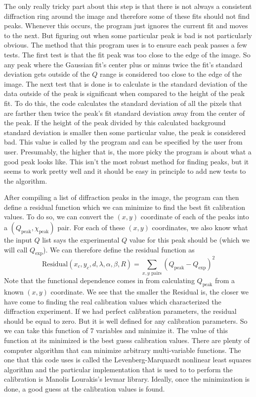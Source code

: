 The only really tricky part about this step is that
there is not always a consistent diffraction ring 
around the image and therefore some of these fits 
should not find peaks. Whenever this occurs, the program
just ignores the current fit and moves to the next. 
But figuring out when some particular peak is bad
is not particularly obvious. The method that this
program uses is to ensure each peak passes a few
tests. The first test is that the fit peak was
too close to the edge of the image. So any peak where
the Gaussian fit's center plus or minus twice the fit's
standard deviation gets outside of the $Q$ range is
considered too close to the edge of the image.
The next test that is done is to calculate is the
standard deviation of the data outside of the peak is
significant when compared to the height of the peak
fit. To do this, the code calculates the standard 
deviation of all the pixels that are farther then twice
the peak's fit standard deviation away from the
center of the peak. If the height of the peak
divided by this calculated background standard deviation
is smaller then some particular value, the peak is
considered bad. This value is called by the program
 and can be specified by the user from user.
Presumably, the higher that  is, the
more picky the program is about what a good peak looks
like. This isn't the most robust method for finding peaks,
but it seems to work pretty well and it should be easy 
in principle to add new tests to the algorithm.

After compiling a list of diffraction peaks in the image,
the program can then define a residual function which
we can minimize to find the best fit calibration values.
To do so, we can convert the $(x,y)$ coordinate
of each of the peaks into a 
$(Q_{\text{peak}},\chi_{\text{peak}})$ pair. 
For each of these $(x,y)$ coordinates, we also
know what the input $Q$ list says the experimental $Q$ 
value for this peak should be (which we will call 
$Q_{\text{exp}}$). We can therefore define
the residual function as
\begin{equation}\label{residual}
    \text{Residual}(x_c,y_c,d,\lambda,\alpha,\beta,R) =  
        \sum_{\text{$x,y$ pairs}}
        (Q_{\text{peak}} - Q_{\text{exp}})^2
\end{equation}
Note that the functional dependence comes in from
calculating $Q_{\text{peak}}$ from a known
$(x,y)$ coordinate. We see that the smaller the 
Residual is, the closer we have come to finding 
the real calibration values which characterized
the diffraction experiment. If we had perfect
calibration parameters, the residual should be
equal to zero. But it is well defined for any
calibration parameters. So we can take this 
function of 7 variables and minimize it. 
The value of this function at its minimized 
is the best guess calibration values.
There are plenty of computer algorithm that
can minimize arbitrary multi-variable functions.
The one that this code uses is called the 
Levenberg-Marquardt
nonlinear least squares algorithm
and the particular implementation that is used
to to perform the calibration is Manolis Lourakis's
levmar library\cite{lourakis04LM}. Ideally, 
once the minimization is done, a good guess at the
calibration values is found.

